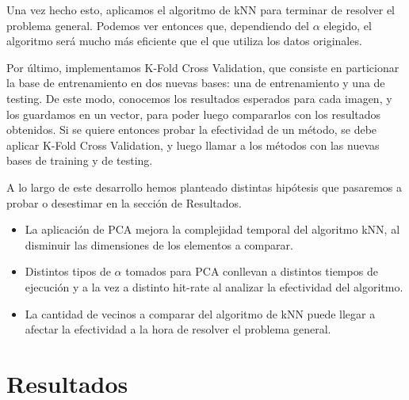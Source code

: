 \documentclass{article}
\begin{document}

Una vez hecho esto, aplicamos el algoritmo de kNN para terminar de resolver el problema general. Podemos ver entonces que, dependiendo del $\alpha$ elegido, el algoritmo será mucho más eficiente que el que utiliza los datos originales.

Por último, implementamos K-Fold Cross Validation, que consiste en particionar la base de entrenamiento en dos nuevas bases: una de entrenamiento y una de testing. De este modo, conocemos los resultados esperados para cada imagen, y los guardamos en un vector, para poder luego compararlos con los resultados obtenidos. Si se quiere entonces probar la efectividad de un método, se debe aplicar K-Fold Cross Validation, y luego llamar a los métodos con las nuevas bases de training y de testing.


A lo largo de este desarrollo hemos planteado distintas hipótesis que pasaremos a probar o desestimar en la sección de Resultados.
\begin{itemize}
  \item La aplicación de PCA mejora la complejidad temporal del algoritmo kNN, al disminuir las dimensiones de los elementos a comparar. 
  \item Distintos tipos de $\alpha$ tomados para PCA conllevan a distintos tiempos de ejecución y a la vez a distinto hit-rate al analizar la efectividad del algoritmo.
  \item La cantidad de vecinos a comparar del algoritmo de kNN puede llegar a afectar la efectividad a la hora de resolver el problema general.
  \end{itemize}

\section*{Resultados}{}
\end{document}
